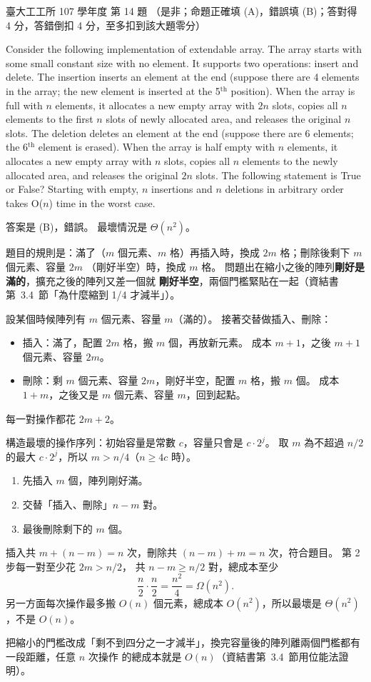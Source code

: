 \begin{pastexam}[label={px:ntu-107-ie-ds-14}]{臺大工工所 107 學年度 第 14 題}
（是非；命題正確填 (A)，錯誤填 (B)；答對得 4 分，答錯倒扣 4 分，至多扣到該大題零分）

Consider the following implementation of extendable array. The array starts with some small constant size with no element. It supports two operations: insert and delete. The insertion inserts an element at the end (suppose there are 4 elements in the array; the new element is inserted at the 5$^{\text{th}}$ position). When the array is full with $n$ elements, it allocates a new empty array with $2n$ slots, copies all $n$ elements to the first $n$ slots of newly allocated area, and releases the original $n$ slots. The deletion deletes an element at the end (suppose there are 6 elements; the 6$^{\text{th}}$ element is erased). When the array is half empty with $n$ elements, it allocates a new empty array with $n$ slots, copies all $n$ elements to the newly allocated area, and releases the original $2n$ slots. The following statement is True or False? Starting with empty, $n$ insertions and $n$ deletions in arbitrary order takes O($n$) time in the worst case.
\end{pastexam}

\begin{pastsoln}
答案是 (B)，錯誤。 最壞情況是 $\Theta(n^2)$。

題目的規則是：滿了（$m$ 個元素、$m$ 格）再插入時，換成 $2m$ 格；刪除後剩下 $m$ 個元素、容量 $2m$
（剛好半空）時，換成 $m$ 格。 問題出在縮小之後的陣列\textbf{剛好是滿的}，擴充之後的陣列又差一個就
\textbf{剛好半空}，兩個門檻緊貼在一起（資結書第~3.4~節「為什麼縮到 1/4 才減半」）。

設某個時候陣列有 $m$ 個元素、容量 $m$（滿的）。 接著交替做插入、刪除：
\begin{itemize}
\item 插入：滿了，配置 $2m$ 格，搬 $m$ 個，再放新元素。 成本 $m + 1$，之後 $m + 1$ 個元素、容量 $2m$。
\item 刪除：剩 $m$ 個元素、容量 $2m$，剛好半空，配置 $m$ 格，搬 $m$ 個。 成本 $1 + m$，之後又是 $m$
個元素、容量 $m$，回到起點。
\end{itemize}
每一對操作都花 $2m + 2$。

構造最壞的操作序列：初始容量是常數 $c$，容量只會是 $c \cdot 2^j$。 取 $m$ 為不超過 $n/2$ 的最大
$c \cdot 2^j$，所以 $m > n/4$（$n \ge 4c$ 時）。
\begin{enumerate}
\item 先插入 $m$ 個，陣列剛好滿。
\item 交替「插入、刪除」$n - m$ 對。
\item 最後刪除剩下的 $m$ 個。
\end{enumerate}
插入共 $m + (n - m) = n$ 次，刪除共 $(n - m) + m = n$ 次，符合題目。 第 2 步每一對至少花 $2m > n/2$，
共 $n - m \ge n/2$ 對，總成本至少
\[
\frac{n}{2} \cdot \frac{n}{2} = \frac{n^2}{4} = \Omega(n^2).
\]
另一方面每次操作最多搬 $O(n)$ 個元素，總成本 $O(n^2)$，所以最壞是 $\Theta(n^2)$，不是 $O(n)$。

把縮小的門檻改成「剩不到四分之一才減半」，換完容量後的陣列離兩個門檻都有一段距離，任意 $n$ 次操作
的總成本就是 $O(n)$（資結書第~3.4~節用位能法證明）。
\end{pastsoln}

